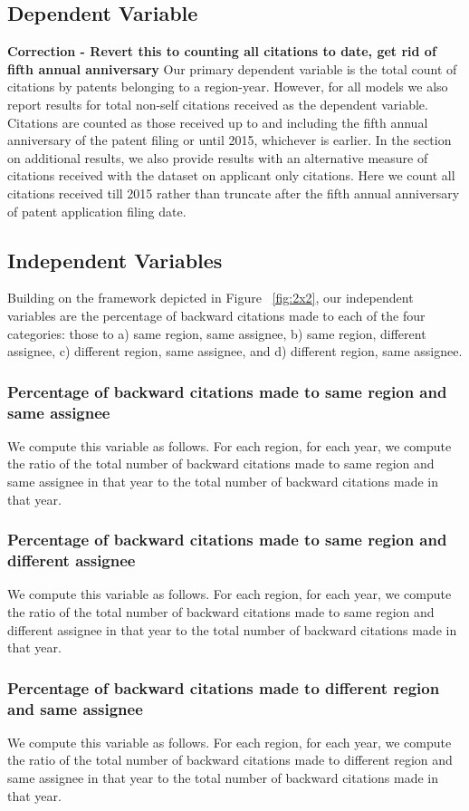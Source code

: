 \documentclass[12pt,letterpaper]{article}
\begin{document}
\subsection{Dependent Variable}
\textbf{Correction - Revert this to counting all citations to date, get rid of fifth annual anniversary}
Our primary dependent variable is the  total count of citations by patents belonging to a region-year. However, for all models we also report results for total non-self citations received as the dependent variable. Citations are counted as those received up to and including the fifth annual anniversary of the patent filing or until  2015, whichever is earlier. In the section on additional results, we also provide results with an alternative measure of citations received with the dataset on applicant only citations. Here we count all citations received till 2015 rather than truncate after the fifth annual anniversary of patent application filing date. 

\subsection{Independent Variables}
Building on the framework depicted in Figure ~\ref{fig:2x2}, our independent variables are the percentage of backward citations made to each of the four categories: those to a) same region, same assignee, b) same region, different assignee, c) different region, same assignee, and d) different region, same assignee. \par
\subsubsection{Percentage of backward citations made to same region and same assignee}
We compute this variable as follows. For each region, for each year, we compute the ratio of the total number of backward citations made to same region and same assignee in that year to the total number of backward citations made in that year.
\subsubsection{Percentage of backward citations made to same region and different assignee}
We compute this variable as follows. For each region, for each year, we compute the ratio of the total number of backward citations made to same region and different assignee in that year to the total number of backward citations made in that year.
\subsubsection{Percentage of backward citations made to different region and same assignee}
We compute this variable as follows. For each region, for each year, we compute the ratio of the total number of backward citations made to different region and same assignee in that year to the total number of backward citations made in that year.
\end{document}
